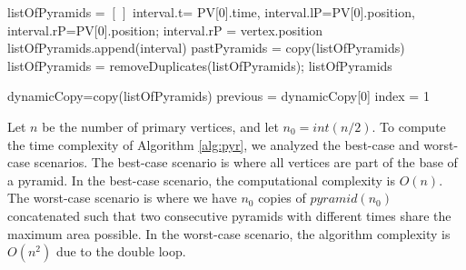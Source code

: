 \documentclass[a4paper]{article}\usepackage[english]{babel}
\theoremstyle{definition}
\newcommand{\apyr}[1][l]{\ensuremath{pyramid(#1)}}
\renewcommand{\emph}[1]{\textbf{#1}}
\begin{document}
\begin{algorithm}[H]
\SetAlgoLined
\KwIn{An ordered list of primary vertices \emph{PV}.}
listOfPyramids = $[\,]$\; interval.t= PV[0].time, interval.lP=PV[0].position, interval.rP=PV[0].position;
{
{interval.rP = vertex.position}
}
listOfPyramids.append(interval)\;
pastPyramids = copy(listOfPyramids)\;
listOfPyramids = removeDuplicates(listOfPyramids); 
\Return listOfPyramids
\caption{$buildChinampas$}\label{alg:pyr}
\end{algorithm}

\begin{algorithm}[H]
\SetAlgoLined
{}
dynamicCopy=copy(listOfPyramids)\;
previous = dynamicCopy[0]\;
index = 1\;
\caption{$removeDuplicates$}\label{alg:correct}
\end{algorithm}

Let $n$ be the number of primary vertices, and let $n_0=int(n/2)$. To compute the time complexity of Algorithm \ref{alg:pyr}, we analyzed the best-case and worst-case scenarios. The best-case scenario is where all vertices are part of the base of a pyramid. In the best-case scenario, the computational complexity is $O(n)$. The worst-case scenario is where we have $n_0$ copies of $\apyr[n_0]$ concatenated such that two consecutive pyramids with different times share the maximum area possible. In the worst-case scenario, the algorithm complexity is $O(n^2)$ due to the double loop. 
\end{document}
